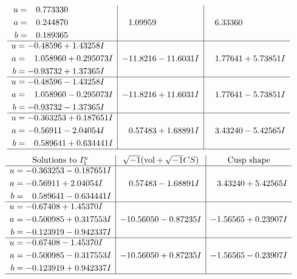 \documentclass[1p]{elsarticle_modified}
\theoremstyle{definition}
\newcommand{\I}{\sqrt{-1}}
\begin{document}
$$\begin{array}{c|c|c}
\begin{aligned}
u &= \phantom{-}0.773330\phantom{ +0.000000I} \\
a &= \phantom{-}0.244870\phantom{ +0.000000I} \\
b &= \phantom{-}0.189365\phantom{ +0.000000I}\end{aligned}
 & \phantom{-}1.09959\phantom{ +0.000000I} & \phantom{-}6.33360\phantom{ +0.000000I} \\ \hline\begin{aligned}
u &= -0.48596 + 1.43258 I \\
a &= \phantom{-}1.058960 + 0.295073 I \\
b &= -0.93732 + 1.37365 I\end{aligned}
 & -11.8216 - 11.6031 I & \phantom{-}1.77641 + 5.73851 I \\ \hline\begin{aligned}
u &= -0.48596 - 1.43258 I \\
a &= \phantom{-}1.058960 - 0.295073 I \\
b &= -0.93732 - 1.37365 I\end{aligned}
 & -11.8216 + 11.6031 I & \phantom{-}1.77641 - 5.73851 I \\ \hline\begin{aligned}
u &= -0.363253 + 0.187651 I \\
a &= -0.56911 - 2.04054 I \\
b &= \phantom{-}0.589641 + 0.634441 I\end{aligned}
 & \phantom{-}0.57483 + 1.68891 I & \phantom{-}3.43240 - 5.42565 I\\
 \hline 
 \end{array}$$\newpage$$\begin{array}{c|c|c}  
\text{Solutions to }I^u_{1}& \I (\text{vol} + \sqrt{-1}CS) & \text{Cusp shape}\\
 \hline 
\begin{aligned}
u &= -0.363253 - 0.187651 I \\
a &= -0.56911 + 2.04054 I \\
b &= \phantom{-}0.589641 - 0.634441 I\end{aligned}
 & \phantom{-}0.57483 - 1.68891 I & \phantom{-}3.43240 + 5.42565 I \\ \hline\begin{aligned}
u &= -0.67408 + 1.45370 I \\
a &= -0.500985 + 0.317553 I \\
b &= -0.123919 - 0.942337 I\end{aligned}
 & -10.56050 - 0.87235 I & -1.56565 + 0.23907 I \\ \hline\begin{aligned}
u &= -0.67408 - 1.45370 I \\
a &= -0.500985 - 0.317553 I \\
b &= -0.123919 + 0.942337 I\end{aligned}
 & -10.56050 + 0.87235 I & -1.56565 - 0.23907 I\\
 \hline 
 \end{array}$$\newpage\newpage\renewcommand{\arraystretch}{1}
\end{document}
